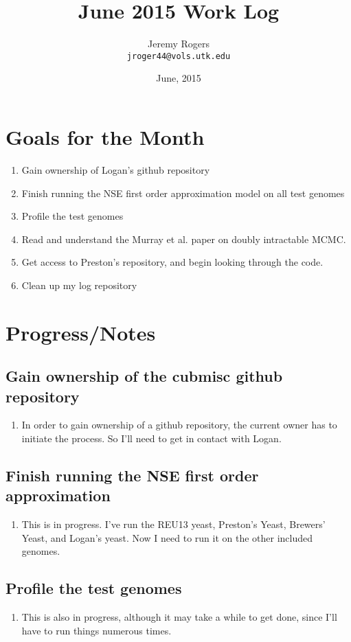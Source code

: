 \documentclass[12 pt]{article}
\title{June 2015 Work Log}
\author{Jeremy Rogers \\
	\texttt{jroger44@vols.utk.edu}}
\date{June, 2015}
\begin{document}
	\maketitle
	\tableofcontents
	
	\section{Goals for the Month}
	\begin{enumerate}
		\item Gain ownership of Logan's github repository
		\item Finish running the NSE first order approximation model on all test genomes
		\item Profile the test genomes
		\item Read and understand the Murray et al. paper on doubly intractable MCMC.
		\item Get access to Preston's repository, and begin looking through the code.
		\item Clean up my log repository
	\end{enumerate}
	\section{Progress/Notes}
	\subsection{Gain ownership of the cubmisc github repository}
	\begin{enumerate}
		\item In order to gain ownership of a github repository, the current owner has to initiate the process. So I'll need to get in contact with Logan.
	\end{enumerate}
	
	\subsection{Finish running the NSE first order approximation}
	\begin{enumerate}
	\item This is in progress. I've run the REU13 yeast, Preston's Yeast, Brewers' Yeast, and Logan's yeast. Now I need to run it on the other included genomes.
	\end{enumerate}
	
	\subsection{Profile the test genomes}
	\begin{enumerate}
		\item This is also in progress, although it may take a while to get done, since I'll have to run things numerous times.
	\end{enumerate}
	
\end{document}
